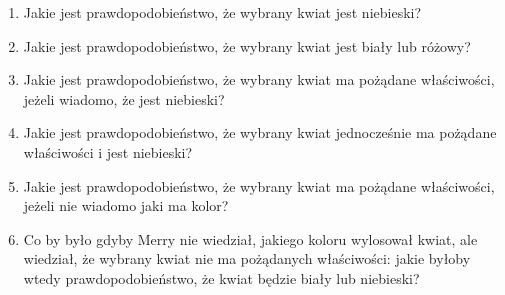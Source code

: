 \documentclass{mwart}
\begin{document}
\begin{enumerate}
\begin{enumerate}
	\item Jakie jest prawdopodobieństwo, że wybrany kwiat jest niebieski?
	\item Jakie jest prawdopodobieństwo, że wybrany kwiat jest biały lub różowy?
	\item Jakie jest prawdopodobieństwo, że wybrany kwiat ma pożądane właściwości, jeżeli wiadomo, że jest niebieski?
	\item Jakie jest prawdopodobieństwo, że wybrany kwiat jednocześnie ma pożądane właściwości i jest niebieski?
	\item Jakie jest prawdopodobieństwo, że wybrany kwiat ma pożądane właściwości, jeżeli nie wiadomo jaki ma kolor?
	\item Co by było gdyby Merry nie wiedział, jakiego koloru wylosował kwiat, ale wiedział, że wybrany kwiat nie ma pożądanych
		właściwości: jakie byłoby wtedy prawdopodobieństwo, że kwiat będzie biały lub niebieski?
\end{enumerate}



\end{enumerate}
\end{document}
